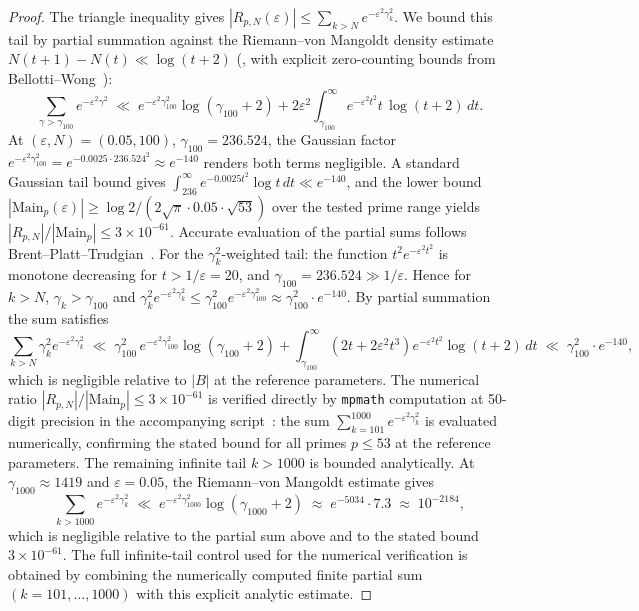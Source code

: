 \documentclass[11pt]{article}
\begin{document}
\begin{proof}
The triangle inequality gives
$|R_{p,N}(\varepsilon)|\le\sum_{k>N} e^{-\varepsilon^2\gamma_k^2}$.
We bound this tail by partial summation against the Riemann--von
Mangoldt density estimate $N(t+1)-N(t)\ll\log(t+2)$
(\cite[Thm.\,5.8]{IwaniecKowalski04},
with explicit zero-counting bounds from Bellotti--Wong~\cite{BellottiWong24}):
\[
\sum_{\gamma>\gamma_{100}} e^{-\varepsilon^2\gamma^2}
\;\ll\;
  e^{-\varepsilon^2 \gamma_{100}^2}\log(\gamma_{100}+2)
  + 2\varepsilon^2\int_{\gamma_{100}}^\infty e^{-\varepsilon^2 t^2}
    t\,\log(t+2)\,dt.
\]
At $(\varepsilon,N)=(0.05,100)$, $\gamma_{100}=236.524$, the Gaussian
factor $e^{-\varepsilon^2 \gamma_{100}^2}=e^{-0.0025\cdot 236.524^2}
\approx e^{-140}$ renders both terms negligible.
A standard Gaussian tail bound gives
$\int_{236}^\infty e^{-0.0025 t^2}\log t\,dt\ll e^{-140}$,
and the lower bound
$|\mathrm{Main}_p(\varepsilon)|\ge
\log 2/(2\sqrt{\pi}\cdot 0.05\cdot\sqrt{53})$
over the tested prime range yields
$|R_{p,N}|/|\mathrm{Main}_p|\le 3\times10^{-61}$.
Accurate evaluation of the partial sums follows
Brent--Platt--Trudgian~\cite{BrentPlattTrudgian21}.
For the $\gamma_k^2$-weighted tail: the function
$t^2 e^{-\varepsilon^2 t^2}$ is monotone decreasing for $t>1/\varepsilon=20$,
and $\gamma_{100}=236.524\gg 1/\varepsilon$.
Hence for $k>N$, $\gamma_k>\gamma_{100}$ and
$\gamma_k^2 e^{-\varepsilon^2\gamma_k^2}
 \le \gamma_{100}^2 e^{-\varepsilon^2\gamma_{100}^2}
 \approx \gamma_{100}^2\cdot e^{-140}$.
By partial summation the sum satisfies
\[
\sum_{k>N}\gamma_k^2 e^{-\varepsilon^2\gamma_k^2}
\;\ll\;
\gamma_{100}^2\,e^{-\varepsilon^2\gamma_{100}^2}\log(\gamma_{100}+2)
+\int_{\gamma_{100}}^\infty(2t+2\varepsilon^2 t^3)e^{-\varepsilon^2 t^2}
  \log(t+2)\,dt
\;\ll\;
\gamma_{100}^2\cdot e^{-140},
\]
which is negligible relative to $|B|$ at the reference parameters.
The numerical ratio $|R_{p,N}|/|\mathrm{Main}_p|\le 3\times10^{-61}$
is verified directly by \texttt{mpmath} computation at 50-digit precision
in the accompanying script~\cite{Code}: the sum
$\sum_{k=101}^{1000}e^{-\varepsilon^2\gamma_k^2}$
is evaluated numerically, confirming the stated bound for
all primes $p\le 53$ at the reference parameters.
The remaining infinite tail $k>1000$ is bounded analytically.
At $\gamma_{1000}\approx 1419$ and $\varepsilon=0.05$, the
Riemann--von Mangoldt estimate gives
\[
\sum_{k>1000}e^{-\varepsilon^2\gamma_k^2}
\;\ll\;
e^{-\varepsilon^2\gamma_{1000}^2}\log(\gamma_{1000}+2)
\;\approx\;
e^{-5034}\cdot 7.3
\;\approx\; 10^{-2184},
\]
which is negligible relative to the partial sum above and to the
stated bound $3\times10^{-61}$.
The full infinite-tail control used for the numerical verification
is obtained by combining the
numerically computed finite partial sum $(k=101,\ldots,1000)$
with this explicit analytic estimate.
\end{proof}
\end{document}
